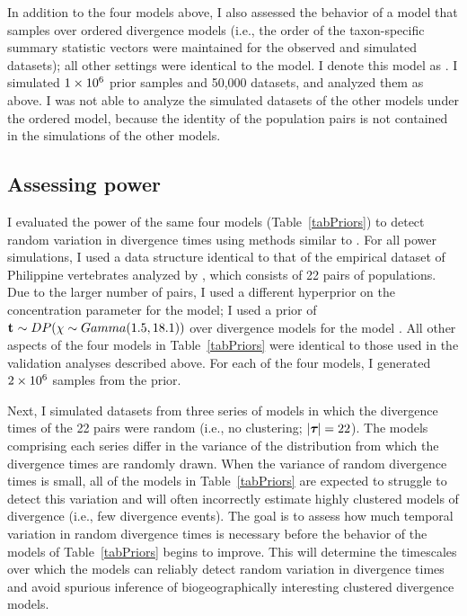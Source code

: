 In addition to the four models above, I also assessed the behavior of a model
that samples over ordered divergence models (i.e., the order of the
taxon-specific summary statistic vectors were maintained for the observed and
simulated datasets); all other settings were identical to the \modelDPP model.
I denote this model as \modelDPPOrdered.
I simulated $1\times 10^{6}$ prior samples and 50,000 datasets, and
analyzed them as above.
I was not able to analyze the simulated datasets of the other models under
the ordered model, because the identity of the population pairs is not
contained in the simulations of the other models.

\subsection{Assessing power}
I evaluated the power of the same four models (Table~\ref{tabPriors}) to
detect random variation in divergence times using methods similar to
\cite{Oaks2012}.
For all power simulations, I used a data structure identical to that of the
empirical dataset of Philippine vertebrates analyzed by \cite{Oaks2012}, which
consists of 22 pairs of populations.
Due to the larger number of pairs, I used a different hyperprior on the
concentration parameter for the \modelDPP model; I used a prior of
$\mathbf{t_{}} \sim DP(\chi \sim Gamma(1.5,18.1))$ over divergence
models for the model \modelDPP.
All other aspects of the four models in Table~\ref{tabPriors} were identical to
those used in the validation analyses described above.
For each of the four models, I generated $2\times 10^{6}$ samples from the prior.

Next, I simulated datasets from three series of models in which the divergence
times of the 22 pairs were random (i.e., no clustering; $\lvert \boldsymbol{\tau_{}} \rvert = 22$).
The models comprising each series differ in the variance of the distribution
from which the divergence times are randomly drawn.
When the variance of random divergence times is small, all of the models in
Table~\ref{tabPriors} are expected to struggle to detect this variation and
will often incorrectly estimate highly clustered models of divergence (i.e.,
few divergence events).
The goal is to assess how much temporal variation in random divergence times is
necessary before the behavior of the models of Table~\ref{tabPriors} begins to
improve.
This will determine the timescales over which the models can reliably detect
random variation in divergence times and avoid spurious inference of
biogeographically interesting clustered divergence models.

